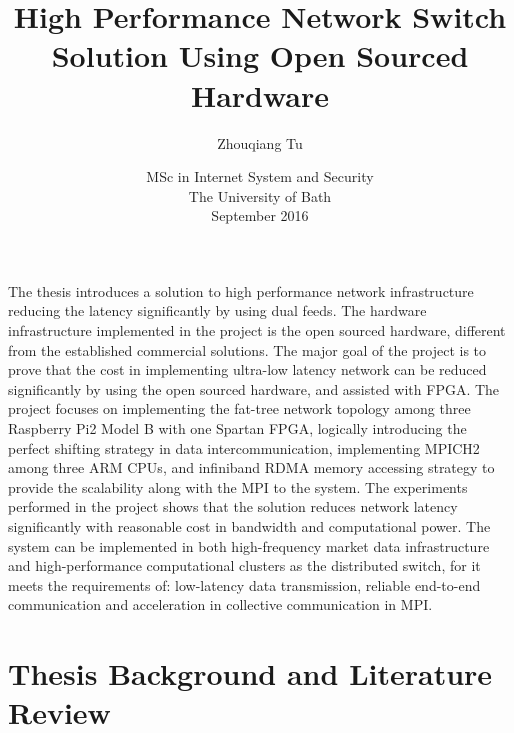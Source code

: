 \documentclass[11pt,openright,a4paper]{report}
\title{High Performance Network Switch Solution Using Open Sourced Hardware}
\author{Zhouqiang Tu}
\date{MSc in Internet System and Security\\The University of Bath\\September 2016}
\begin{document}
\lstset{language=Java,breaklines,breakatwhitespace,basicstyle=\small}


\setcounter{page}{0}


\maketitle
\newpage


\newpage


\newpage


\abstract
The thesis introduces a solution to high performance network infrastructure reducing the latency significantly by using dual feeds. The hardware infrastructure implemented in the project is the open sourced hardware, different from the established commercial solutions. The major goal of the project is to prove that the cost in implementing ultra-low latency network can be reduced significantly by using the open sourced hardware, and assisted with FPGA. The project focuses on implementing the fat-tree network topology among three Raspberry Pi2 Model B with one Spartan FPGA, logically introducing the perfect shifting strategy in data intercommunication, implementing MPICH2 among three ARM CPUs, and infiniband RDMA memory accessing strategy to provide the scalability along with the MPI to the system. The experiments performed in the project shows that the solution reduces network latency significantly with reasonable cost in bandwidth and computational power. The system can be implemented in both high-frequency market data infrastructure and high-performance computational clusters as the distributed switch, for it meets the requirements of: low-latency data transmission, reliable end-to-end communication and acceleration in collective communication in MPI.  
\newpage

\tableofcontents
\newpage
\listoffigures
\newpage
\listoftables
\newpage

\setcounter{page}{1}



\chapter{Thesis Background and Literature Review}
\end{document}
